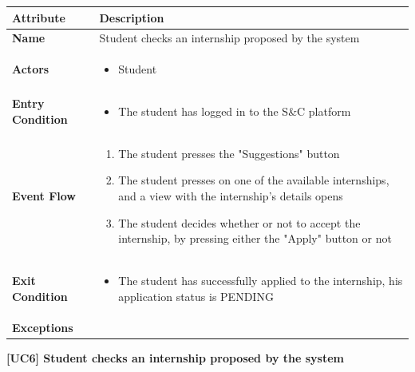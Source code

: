 \begin{center}
    
    \begin{tabular}{|p{3cm}|p{9cm}|}
    \hline
    \textbf{Attribute} & \textbf{Description} \\ \hline
    \textbf{Name} & Student checks an internship proposed by the system \\ \hline
    \textbf{Actors} & 
    \begin{itemize}
        \item Student
    \end{itemize} \\ \hline
    \textbf{Entry Condition} & 
    \begin{itemize}
        \item The student has logged in to the S\&C platform
    \end{itemize} \\ \hline
    \textbf{Event Flow} & 
    \begin{enumerate}
        \item The student presses the "Suggestions" button
        \item The student presses on one of the available internships, and a view with the internship's details opens
        \item The student decides whether or not to accept the internship, by pressing either the "Apply" button or not
    \end{enumerate} \\ \hline
    \textbf{Exit Condition} & 
    \begin{itemize}
        \item The student has successfully applied to the internship, his application status is PENDING
    \end{itemize} \\ \hline
    \textbf{Exceptions} & \\ \hline
    \end{tabular}
    \newline
    \newline
    \textbf{[UC6] Student checks an internship proposed by the system}
    \newline
    \newline
    

\end{center}
